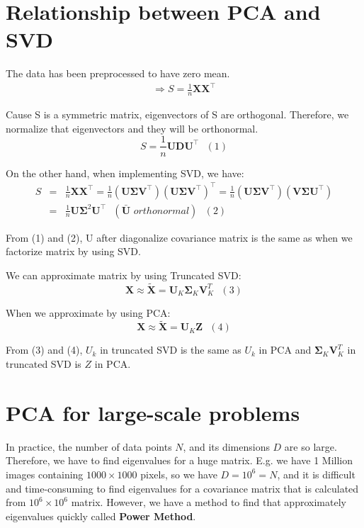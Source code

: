 \documentclass[a4paper, 12pt]{report}
\begin{document}
\section{Relationship between PCA and SVD} 
\indent \par The data has been preprocessed to have zero mean.
\begin{eqnarray*}
\Rightarrow  S=\frac{1}{n}\mathbf X\mathbf X^\top
\end{eqnarray*}
\par Cause S is a symmetric matrix, eigenvectors of S are orthogonal. Therefore, we normalize that eigenvectors and they will be orthonormal.
$$S=\frac{1}{n}\mathbf U\mathbf D\mathbf U^\top~~~(1)$$
\par On the other hand, when implementing SVD, we have:
\begin{eqnarray*}
S &=&\frac{1}{n}\mathbf X\mathbf X^\top
=\frac{1}{n}(\mathbf U\mathbf \Sigma\mathbf V^\top)(\mathbf U\mathbf \Sigma\mathbf V^\top)^\top
= \frac{1}{n}(\mathbf U\mathbf \Sigma\mathbf V^\top)(\mathbf V\mathbf \Sigma\mathbf U^\top)\\
&=&\frac{1}{n}\mathbf U\mathbf \Sigma^2 \mathbf U^\top ~~~(\bar{\mathbf{U}}\,\, orthonormal) ~~~(2)
\end{eqnarray*}
\par From (1) and (2), U after diagonalize covariance matrix is the same as when we factorize matrix by using SVD.
\par We can approximate matrix by using Truncated SVD:
$$\mathbf{X} \approx \tilde{\mathbf{X}} = \mathbf{U}_K \mathbf{\Sigma}_K \mathbf{V}_K^T~~~(3)$$
\par When we approximate by using PCA:
$$\mathbf{X} \approx \tilde{\mathbf{X}} = \mathbf{U}_K \mathbf{Z}~~~(4)$$
\par From (3) and (4), $U_k$ in truncated SVD is the same as $U_k$ in PCA and 
$ \mathbf{\Sigma}_K \mathbf{V}_K^T$ in truncated SVD is $Z$ in PCA.

\section{PCA for large-scale problems}

\indent \par In practice, the number of data points $N$, and its dimensions $D$ are so large. Therefore, we have to find eigenvalues for a huge matrix. E.g. we have 1 Million images containing $1000 \times 1000$ pixels, so we have $D = 10^6 = N$, and it is difficult and time-consuming to find eigenvalues for a covariance matrix that is calculated from $10^6 \times 10^6$ matrix. However, we have a method to find that approximately eigenvalues quickly called \textbf{Power Method}.
\end{document}
